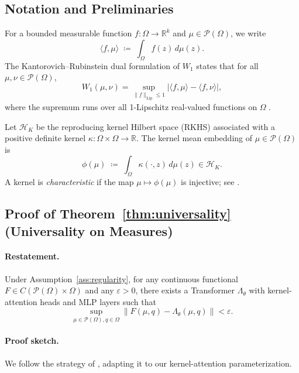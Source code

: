 \documentclass{article}
\theoremstyle{plain}
\theoremstyle{definition}
\theoremstyle{remark}
\newcommand{\OmegaSpace}{\Omega} %
\newcommand{\Pspace}{\mathcal{P}(\OmegaSpace)} %
\newcommand{\Wass}[1]{W_{#1}} %
\begin{document}
\subsection{Notation and Preliminaries}

For a bounded measurable function $f:\OmegaSpace \to \mathbb{R}^k$ and
$\mu \in \Pspace$, we write
\[
    \langle f,\mu\rangle \;\coloneqq\; \int_{\OmegaSpace} f(z)\, d\mu(z).
\]
The Kantorovich--Rubinstein dual formulation of $\Wass{1}$ states that for all
$\mu,\nu \in \Pspace$,
\begin{equation}
    \Wass{1}(\mu,\nu)
    =
    \sup_{\|f\|_{\mathrm{Lip}} \le 1}
    \left|
        \langle f,\mu\rangle
        -
        \langle f,\nu\rangle
    \right|,
\end{equation}
where the supremum runs over all 1-Lipschitz real-valued functions on $\OmegaSpace$
\citep{villani2009optimal}.

Let $\mathcal{H}_K$ be the reproducing kernel Hilbert space (RKHS) associated with a
positive definite kernel $\kappa:\OmegaSpace \times \OmegaSpace \to \mathbb{R}$. The
kernel mean embedding of $\mu\in\Pspace$ is
\[
    \phi(\mu) \;\coloneqq\; \int_{\OmegaSpace} \kappa(\cdot,z)\, d\mu(z) \in \mathcal{H}_K.
\]
A kernel is \emph{characteristic} if the map $\mu\mapsto \phi(\mu)$ is injective; see
\citet{muandet2017kernel,sriperumbudur2010hilbert}.

\subsection{Proof of Theorem~\ref{thm:universality} (Universality on Measures)}
\label{app:proof_universality}

\paragraph{Restatement.}
Under Assumption~\ref{ass:regularity}, for any continuous functional
$F \in C(\Pspace \times \OmegaSpace)$ and any $\varepsilon>0$, there exists a Transformer
$\Lambda_\theta$ with kernel-attention heads and MLP layers such that
\[
    \sup_{\mu\in\Pspace,q\in\OmegaSpace}
    \big\|F(\mu,q)-\Lambda_\theta(\mu,q)\big\| < \varepsilon.
\]

\paragraph{Proof sketch.}
We follow the strategy of \citet{furuya2025transformers}, adapting it to our
kernel-attention parameterization.
\end{document}
